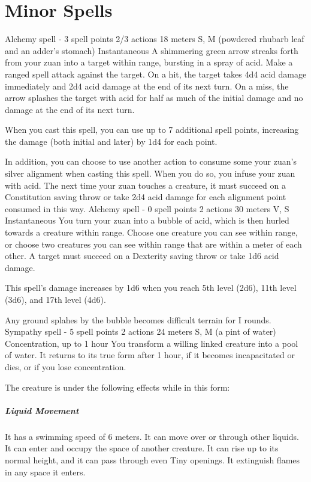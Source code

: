 \section{Minor Spells} \label{sec::minorspells}
    {Alchemy spell - 3 spell points}
    {2/3 actions}
    {18 meters}
    {S, M (powdered rhubarb leaf and an adder's stomach)}
    {Instantaneous}
    A shimmering green arrow streaks forth from your zuan into a target within range, bursting in a spray of acid.
    Make a ranged spell attack against the target.
    On a hit, the target takes 4d4 acid damage immediately and 2d4 acid damage at the end of its next turn.
    On a miss, the arrow splashes the target with acid for half as much of the initial damage and no damage at the end of its next turn.

    When you cast this spell, you can use up to 7 additional spell points, increasing the damage (both initial and later) by 1d4 for each point.

    In addition, you can choose to use another action to consume some your zuan's silver alignment when casting this spell.
    When you do so, you infuse your zuan with acid.
    The next time your zuan touches a creature, it must succeed on a Constitution saving throw or take 2d4 acid damage for each alignment point consumed in this way.
    {Alchemy spell - 0 spell points}
    {2 actions}
    {30 meters}
    {V, S}
    {Instantaneous}
    You turn your zuan into a bubble of acid, which is then hurled towards a creature within range.
    Choose one creature you can see within range, or choose two creatures you can see within range that are within a meter of each other.
    A target must succeed on a Dexterity saving throw or take 1d6 acid damage.

    This spell's damage increases by 1d6 when you reach 5th level (2d6), 11th level (3d6), and 17th level (4d6).

    Any ground splahes by the bubble becomes difficult terrain for I rounds.
    {Sympathy spell - 5 spell points}
    {2 actions}
    {24 meters}
    {S, M (a pint of water)}
    {Concentration, up to 1 hour}
    You transform a willing linked creature into a pool of water.
    It returns to its true form after 1 hour, if it becomes incapacitated or dies, or if you lose concentration.

    The creature is under the following effects while in this form:
    \subparagraph{Liquid Movement}
    It has a swimming speed of 6 meters.
    It can move over or through other liquids.
    It can enter and occupy the space of another creature.
    It can rise up to its normal height, and it can pass through even Tiny openings.
    It extinguish flames in any space it enters.

